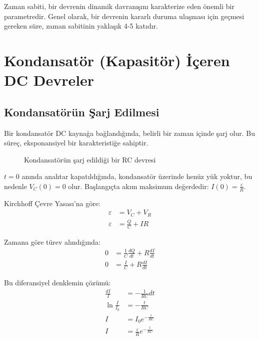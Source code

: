 \documentclass[11pt,letterpaper,twocolumn]{fenbil}
\begin{document}
Zaman sabiti, bir devrenin dinamik davranışını karakterize eden önemli bir parametredir. Genel olarak, bir devrenin kararlı duruma ulaşması için geçmesi gereken süre, zaman sabitinin yaklaşık 4-5 katıdır.

\section{Kondansatör (Kapasitör) İçeren DC Devreler}

\subsection{Kondansatörün Şarj Edilmesi}

Bir kondansatör DC kaynağa bağlandığında, belirli bir zaman içinde şarj olur. Bu süreç, eksponansiyel bir karakteristiğe sahiptir.

\begin{figure}[h]
\centering
{}
\caption{Kondansatörün şarj edildiği bir RC devresi}
\end{figure}

$t = 0$ anında anahtar kapatıldığında, kondansatör üzerinde henüz yük yoktur, bu nedenle $V_C(0) = 0$ olur. Başlangıçta akım maksimum değerdedir: $I(0) = \frac{\varepsilon}{R}$.

Kirchhoff Çevre Yasası'na göre:
\begin{align}
\varepsilon &= V_C + V_R\\
\varepsilon &= \frac{Q}{C} + IR
\end{align}

Zamana göre türev alındığında:
\begin{align}
0 &= \frac{1}{C}\frac{dQ}{dt} + R\frac{dI}{dt}\\
0 &= \frac{I}{C} + R\frac{dI}{dt}
\end{align}

Bu diferansiyel denklemin çözümü:
\begin{align}
\frac{dI}{I} &= -\frac{1}{RC}dt\\
\ln\frac{I}{I_0} &= -\frac{t}{RC}\\
I &= I_0 e^{-\frac{t}{RC}}\\
I &= \frac{\varepsilon}{R}e^{-\frac{t}{RC}}
\end{align}
\end{document}
